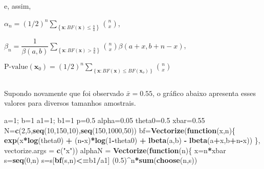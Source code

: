 \documentclass[
]{book}
\newenvironment{Shaded}{\begin{snugshade}}{\end{snugshade}}
\newcommand{\ControlFlowTok}[1]{\textcolor[rgb]{0.13,0.29,0.53}{\textbf{#1}}}
\newcommand{\DataTypeTok}[1]{\textcolor[rgb]{0.13,0.29,0.53}{#1}}
\newcommand{\DecValTok}[1]{\textcolor[rgb]{0.00,0.00,0.81}{#1}}
\newcommand{\FloatTok}[1]{\textcolor[rgb]{0.00,0.00,0.81}{#1}}
\newcommand{\KeywordTok}[1]{\textcolor[rgb]{0.13,0.29,0.53}{\textbf{#1}}}
\newcommand{\NormalTok}[1]{#1}
\newcommand{\OperatorTok}[1]{\textcolor[rgb]{0.81,0.36,0.00}{\textbf{#1}}}
\newcommand{\StringTok}[1]{\textcolor[rgb]{0.31,0.60,0.02}{#1}}
\begin{document}
e, assim,

\(\alpha_n = \displaystyle {(1/2)^{n}} \sum_{\left\{\boldsymbol x: BF(\boldsymbol x)\leq\frac{b}{a}\right\}}\binom{n}{x}\),

\(\beta_n = \displaystyle \dfrac{1}{{\beta(a,b)}} \sum_{\left\{\boldsymbol x: BF(\boldsymbol x)>\frac{b}{a}\right\}}\binom{n}{x}\beta(a+x,b+n-x)\),

\(\text{P-value}(\boldsymbol x_0) = \displaystyle {(1/2)^{n}} \sum_{\left\{\boldsymbol x: BF(\boldsymbol x)\leq BF(\boldsymbol x_o)\right\}}\binom{n}{x}\)

\(~\)

Supondo novamente que foi observado \(\bar{x}=0.55\), o gráfico abaixo apresenta esses valores para diversos tamanhos amostrais.

\begin{Shaded}
\begin{Highlighting}[]
\NormalTok{a=}\DecValTok{1}\NormalTok{; b=}\DecValTok{1}
\NormalTok{a1=}\DecValTok{1}\NormalTok{; b1=}\DecValTok{1}
\NormalTok{p=}\FloatTok{0.5}
\NormalTok{alpha=}\FloatTok{0.05}
\NormalTok{theta0=}\FloatTok{0.5}
\NormalTok{xbar=}\FloatTok{0.55}
\NormalTok{N=}\KeywordTok{c}\NormalTok{(}\DecValTok{2}\NormalTok{,}\DecValTok{5}\NormalTok{,}\KeywordTok{seq}\NormalTok{(}\DecValTok{10}\NormalTok{,}\DecValTok{150}\NormalTok{,}\DecValTok{10}\NormalTok{),}\KeywordTok{seq}\NormalTok{(}\DecValTok{150}\NormalTok{,}\DecValTok{1000}\NormalTok{,}\DecValTok{50}\NormalTok{))}
\NormalTok{bf=}\KeywordTok{Vectorize}\NormalTok{(}\ControlFlowTok{function}\NormalTok{(x,n)\{}
  \KeywordTok{exp}\NormalTok{(x}\OperatorTok{*}\KeywordTok{log}\NormalTok{(theta0) }\OperatorTok{+}\StringTok{ }\NormalTok{(n}\OperatorTok{-}\NormalTok{x)}\OperatorTok{*}\KeywordTok{log}\NormalTok{(}\DecValTok{1}\OperatorTok{-}\NormalTok{theta0) }\OperatorTok{+}\StringTok{ }\KeywordTok{lbeta}\NormalTok{(a,b) }\OperatorTok{-}\StringTok{ }\KeywordTok{lbeta}\NormalTok{(a}\OperatorTok{+}\NormalTok{x,b}\OperatorTok{+}\NormalTok{n}\OperatorTok{-}\NormalTok{x))}
\NormalTok{\}, }\DataTypeTok{vectorize.args =} \KeywordTok{c}\NormalTok{(}\StringTok{"x"}\NormalTok{))}
\NormalTok{alphaN =}\StringTok{ }\KeywordTok{Vectorize}\NormalTok{(}\ControlFlowTok{function}\NormalTok{(n)\{}
\NormalTok{  x=n}\OperatorTok{*}\NormalTok{xbar}
\NormalTok{  s=}\KeywordTok{seq}\NormalTok{(}\DecValTok{0}\NormalTok{,n)}
\NormalTok{  s=s[}\KeywordTok{bf}\NormalTok{(s,n)}\OperatorTok{<=}\NormalTok{b1}\OperatorTok{/}\NormalTok{a1]}
\NormalTok{  (}\FloatTok{0.5}\NormalTok{)}\OperatorTok{^}\NormalTok{n}\OperatorTok{*}\KeywordTok{sum}\NormalTok{(}\KeywordTok{choose}\NormalTok{(n,s))}

\end{Highlighting}
\end{Shaded}
\end{document}
